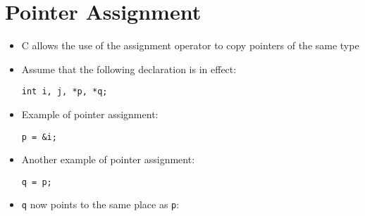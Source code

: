 \documentclass{article}
\begin{document}
\section{Pointer Assignment}
\begin{itemize}
\item C allows the use of the assignment operator to copy pointers of the same type

\item Assume that the following declaration is in effect:
\begin{verbatim}
int i, j, *p, *q;
\end{verbatim}

\item Example of pointer assignment:
\begin{verbatim}
p = &i;
\end{verbatim}
\end{itemize}

\begin{itemize}
\item Another example of pointer assignment:
\begin{verbatim}
q = p;
\end{verbatim}
\item \verb!q! now points to the same place as \verb!p!:

\begin{center}
\end{center}

\end{itemize}
\end{document}

